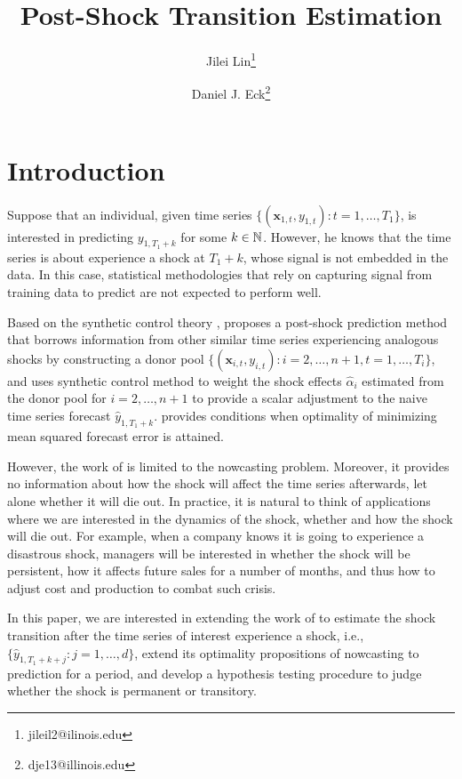 \documentclass[12pt]{article}
\title{Post-Shock Transition Estimation}
\author{Jilei Lin\thanks{jileil2@ilinois.edu} }
\author{Daniel J. Eck\thanks{dje13@illinois.edu}}
\affil{Department of Statistics, University of Illinois at Urbana-Champaign}
\begin{document}
\maketitle

\section{Introduction}

Suppose that an individual, given time series $\{(\mathbf{x}_{1, t},y_{1,t})\colon t=1, \ldots, T_1\}$, is interested in predicting $y_{1, T_1+k}$ for some $k \in \mathbb{N}$. However,  he knows that the time series is about experience a shock at $T_1+k$, whose signal is not embedded in the data. In this case,   statistical methodologies that rely on capturing signal from training data to predict are not expected to perform well. 

Based on the synthetic control theory \cite{abadie2010synthetic}, \citet{lin2020minimizing} proposes a post-shock prediction method that borrows information from other similar  time series experiencing analogous shocks by constructing a donor pool $\{(\mathbf{x}_{i, t},y_{i,t})\colon i = 2, \ldots, n +1, t = 1, \ldots, T_i\}$, and uses synthetic control method to weight the shock effects $\hat{\alpha}_i$ estimated from the donor pool for $i = 2, \ldots, n+1$ to provide a scalar adjustment to the naive time series forecast $\hat{y}_{1, T_1+k}$. \citet{lin2020minimizing} provides conditions when  optimality of minimizing mean squared forecast error is attained.

However, the work of \citet{lin2020minimizing} is limited to the nowcasting problem. Moreover, it provides no information about how the shock will affect the time series afterwards, let alone whether it will die out.  In practice, it is natural to think of applications where we are interested in the dynamics of the shock, whether and how the shock will die out. For example, when a company knows it is going to experience a disastrous shock, managers will be interested in  whether the shock will be persistent, how it affects future sales for a number of months, and thus how to adjust cost and production to combat such crisis. 

In this paper, we are interested in extending the work of \citet{lin2020minimizing} to estimate the shock transition after the time series of interest experience a shock, i.e., $\{\hat{y}_{1, T_1+k+j}\colon j = 1, \ldots, d\}$, extend its optimality propositions of nowcasting to prediction for a period, and develop a hypothesis testing procedure to judge whether the shock is permanent or transitory.
\end{document}
